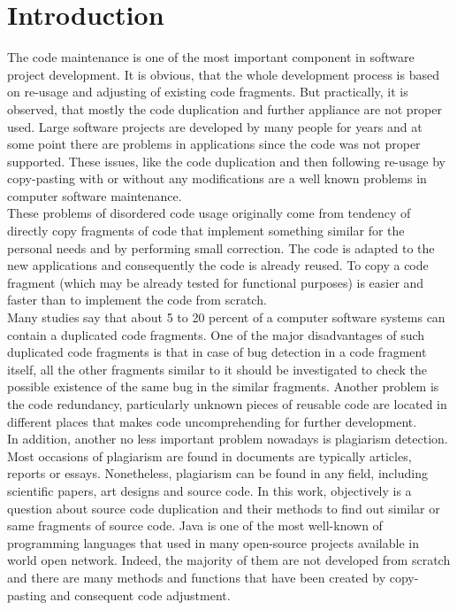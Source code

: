 \documentclass{report}
\begin{document}
\chapter{Introduction}
The code maintenance is one of the most important component in software project development. It is obvious, that the whole development process is based on re-usage and adjusting of existing code fragments. But practically, it is observed, that mostly the code duplication and further appliance are not proper used. Large software projects are developed by many people for years and at some point there are problems in applications since the code was not proper supported. These issues, like the code duplication and then following re-usage by copy-pasting with or without any modifications are a well known problems in computer software maintenance.
\\
These problems of disordered code usage originally come from tendency of directly copy fragments of code that implement something similar for the personal needs and by performing small correction. The code is adapted to the new applications and consequently the code is already reused. To copy a code fragment (which may be already tested for functional purposes) is easier and faster than to implement the code from scratch.
\\
Many studies say that about 5 to 20 percent of a computer software systems can contain a duplicated code fragments. One of the major disadvantages of such duplicated code fragments is that in case of bug detection in a code fragment itself, all the other fragments similar to it should be investigated to check the possible existence of the same bug in the similar fragments. Another problem is the code redundancy, particularly unknown pieces of reusable code are located in different places that makes code uncomprehending for further development. 
\\
In addition, another no less important problem nowadays is plagiarism detection. Most occasions of plagiarism are found in documents are typically articles, reports or essays. Nonetheless, plagiarism can be found in any field, including scientific papers, art designs and source code. In this work, objectively is a question about source code duplication and their methods to find out similar or same fragments of source code. Java is one of the most well-known of programming languages that used in many open-source projects available in world open network. Indeed, the majority of them are not developed from scratch and there are many methods and functions that have been created by copy-pasting and consequent code adjustment.
\end{document}
